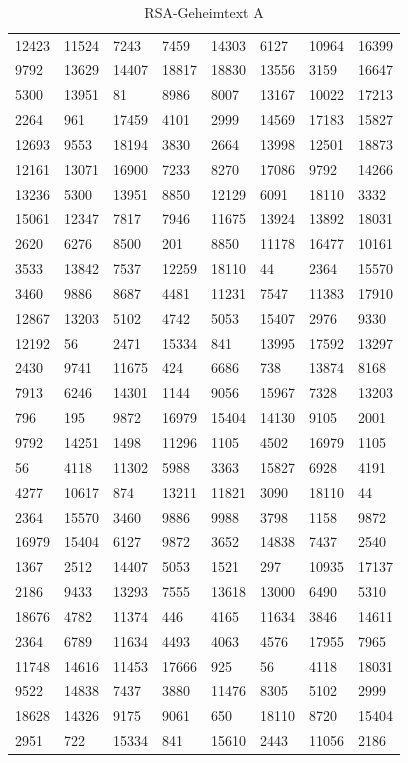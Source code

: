 \begin{refsegment}
\begin{table}[ht]
{\tt
\begin{tabular}{llllllll}
12423 & 11524  & 7243  & 7459 & 14303  & 6127 & 10964 & 16399\\
 9792 & 13629 & 14407 & 18817 & 18830 & 13556  & 3159 & 16647\\
 5300 & 13951    & 81  & 8986  & 8007 & 13167 & 10022 & 17213\\
 2264   & 961 & 17459  & 4101  & 2999 & 14569 & 17183 & 15827\\
12693  & 9553 & 18194  & 3830  & 2664 & 13998 & 12501 & 18873\\
12161 & 13071 & 16900  & 7233  & 8270 & 17086  & 9792 & 14266\\
13236  & 5300 & 13951  & 8850 & 12129  & 6091 & 18110  & 3332\\
15061 & 12347  & 7817  & 7946 & 11675 & 13924 & 13892 & 18031\\
 2620  & 6276  & 8500   & 201  & 8850 & 11178 & 16477 & 10161\\
 3533 & 13842  & 7537 & 12259 & 18110    & 44  & 2364 & 15570\\
 3460  & 9886  & 8687  & 4481 & 11231  & 7547 & 11383 & 17910\\
12867 & 13203  & 5102  & 4742  & 5053 & 15407  & 2976  & 9330\\
12192    & 56  & 2471 & 15334   & 841 & 13995 & 17592 & 13297\\
 2430  & 9741 & 11675   & 424  & 6686   & 738 & 13874  & 8168\\
 7913  & 6246 & 14301  & 1144  & 9056 & 15967  & 7328 & 13203\\
  796   & 195  & 9872 & 16979 & 15404 & 14130  & 9105  & 2001\\
 9792 & 14251  & 1498 & 11296  & 1105  & 4502 & 16979  & 1105\\
   56  & 4118 & 11302  & 5988  & 3363 & 15827  & 6928  & 4191\\
 4277 & 10617   & 874 & 13211 & 11821  & 3090 & 18110    & 44\\
 2364 & 15570  & 3460  & 9886  & 9988  & 3798  & 1158  & 9872\\
16979 & 15404  & 6127  & 9872  & 3652 & 14838  & 7437  & 2540\\
 1367  & 2512 & 14407  & 5053  & 1521   & 297 & 10935 & 17137\\
 2186  & 9433 & 13293  & 7555 & 13618 & 13000  & 6490  & 5310\\
18676  & 4782 & 11374   & 446  & 4165 & 11634  & 3846 & 14611\\
 2364  & 6789 & 11634  & 4493  & 4063  & 4576 & 17955  & 7965\\
11748 & 14616 & 11453 & 17666   & 925    & 56  & 4118 & 18031\\
 9522 & 14838  & 7437  & 3880 & 11476  & 8305  & 5102  & 2999\\
18628 & 14326  & 9175  & 9061   & 650 & 18110  & 8720 & 15404\\
 2951   & 722 & 15334   & 841 & 15610  & 2443 & 11056  & 2186
\end{tabular} } %
\caption{RSA-Geheimtext A}
\label{stinson1}
\end{table}


\end{refsegment}
